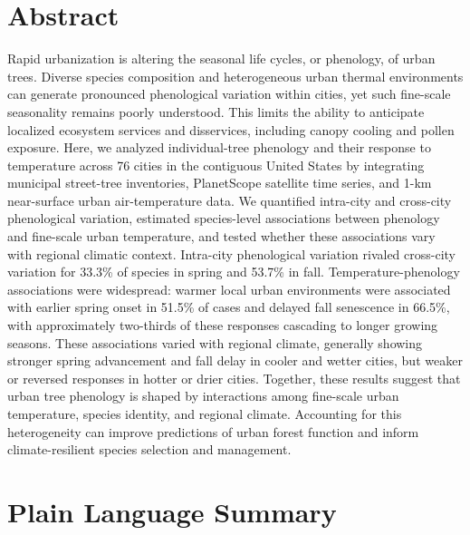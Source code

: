 
\clearpage

\section*{Abstract}

Rapid urbanization is altering the seasonal life cycles, or phenology, of urban trees. Diverse species composition and heterogeneous urban thermal environments can generate pronounced phenological variation within cities, yet such fine-scale seasonality remains poorly understood. This limits the ability to anticipate localized ecosystem services and disservices, including canopy cooling and pollen exposure. Here, we analyzed individual-tree phenology and their response to temperature across 76 cities in the contiguous United States by integrating municipal street-tree inventories, PlanetScope satellite time series, and 1-km near-surface urban air-temperature data. We quantified intra-city and cross-city phenological variation, estimated species-level associations between phenology and fine-scale urban temperature, and tested whether these associations vary with regional climatic context. Intra-city phenological variation rivaled cross-city variation for 33.3\% of species in spring and 53.7\% in fall. Temperature-phenology associations were widespread: warmer local urban environments were associated with earlier spring onset in 51.5\% of cases and delayed fall senescence in 66.5\%, with approximately two-thirds of these responses cascading to longer growing seasons. These associations varied with regional climate, generally showing stronger spring advancement and fall delay in cooler and wetter cities, but weaker or reversed responses in hotter or drier cities. Together, these results suggest that urban tree phenology is shaped by interactions among fine-scale urban temperature, species identity, and regional climate. Accounting for this heterogeneity can improve predictions of urban forest function and inform climate-resilient species selection and management.

\section*{Plain Language Summary}

